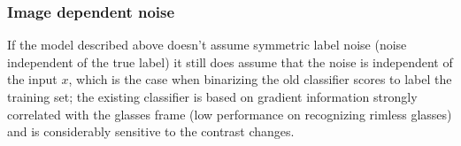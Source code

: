 \documentclass[a4paper]{article}
\begin{document}
            

        \subsubsection{Image dependent noise}
            If the model described above doesn't assume symmetric label noise (noise independent of the true label) it still does assume that the noise is independent of the input $x$, which is the case when binarizing the old classifier scores to label the training set; the existing classifier is based on gradient information strongly correlated with the glasses frame (low performance on recognizing rimless glasses) and is considerably sensitive to the contrast changes. 
\end{document}
